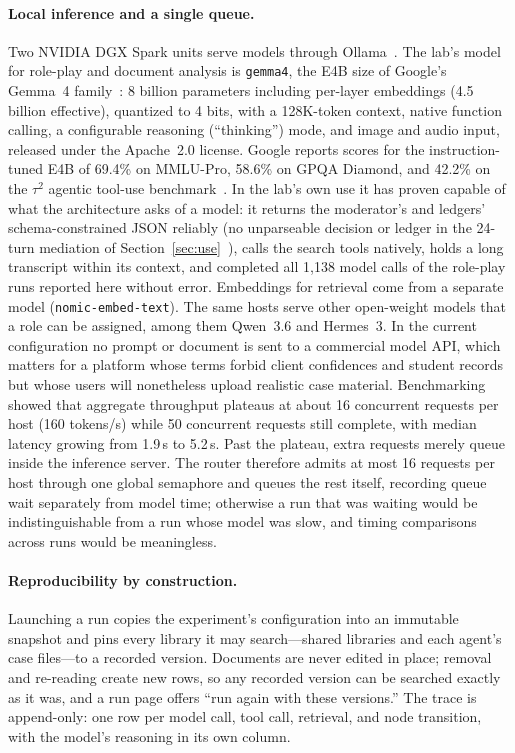 \documentclass[acmsmall,screen,review]{acmart}
\newcommand{\code}[1]{\texttt{\small #1}}
\begin{document}
\paragraph{Local inference and a single queue.} Two NVIDIA DGX Spark units serve models through Ollama~\cite{ollama}. The lab's model for role-play and document analysis is \code{gemma4}, the E4B size of Google's Gemma~4 family~\cite{gemma4report,gemma4card}: 8 billion parameters including per-layer embeddings (4.5 billion effective), quantized to 4 bits, with a 128K-token context, native function calling, a configurable reasoning (``thinking'') mode, and image and audio input, released under the Apache~2.0 license. Google reports scores for the instruction-tuned E4B of 69.4\% on MMLU-Pro, 58.6\% on GPQA Diamond, and 42.2\% on the $\tau^2$ agentic tool-use benchmark~\cite{gemma4card}. In the lab's own use it has proven capable of what the architecture asks of a model: it returns the moderator's and ledgers' schema-constrained JSON reliably (no unparseable decision or ledger in the 24-turn mediation of Section~\ref{sec:use}~\cite{gong2026moderation}), calls the search tools natively, holds a long transcript within its context, and completed all 1{,}138 model calls of the role-play runs reported here without error. Embeddings for retrieval come from a separate model (\code{nomic-embed-text}). The same hosts serve other open-weight models that a role can be assigned, among them Qwen~3.6 and Hermes~3. In the current configuration no prompt or document is sent to a commercial model API, which matters for a platform whose terms forbid client confidences and student records but whose users will nonetheless upload realistic case material. Benchmarking showed that aggregate throughput plateaus at about 16 concurrent requests per host (160 tokens/s) while 50 concurrent requests still complete, with median latency growing from 1.9\,s to 5.2\,s. Past the plateau, extra requests merely queue inside the inference server. The router therefore admits at most 16 requests per host through one global semaphore and queues the rest itself, recording queue wait separately from model time; otherwise a run that was waiting would be indistinguishable from a run whose model was slow, and timing comparisons across runs would be meaningless.

\paragraph{Reproducibility by construction.} Launching a run copies the experiment's configuration into an immutable snapshot and pins every library it may search---shared libraries and each agent's case files---to a recorded version. Documents are never edited in place; removal and re-reading create new rows, so any recorded version can be searched exactly as it was, and a run page offers ``run again with these versions.'' The trace is append-only: one row per model call, tool call, retrieval, and node transition, with the model's reasoning in its own column.
\end{document}
